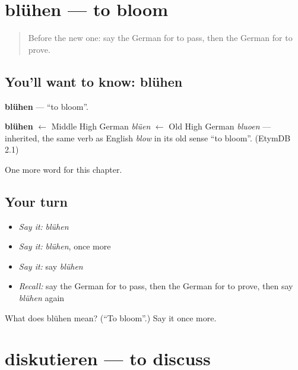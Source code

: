 \section[blühen]{blühen — to bloom}

\label{lesson:GE-C247-bluehen}



\begin{quote}
Before the new one: say the German for to pass, then the German for to prove.
\end{quote}

\subsection*{You'll want to know: blühen}
\textbf{blühen} — \textquotedblleft{}to bloom\textquotedblright{}.

\begin{cousinweb}
\textbf{blühen} $\leftarrow$ Middle High German \emph{blüen} $\leftarrow$ Old High German \emph{bluoen} — inherited, the same verb as English \emph{blow} in its old sense \textquotedblleft{}to bloom\textquotedblright{}. (EtymDB 2.1)
\end{cousinweb}

\begin{grammarlens}[title={What you've built}]
One more word for this chapter.
\end{grammarlens}

\subsection*{Your turn}
\begin{itemize}
\raggedright
  \item \emph{Say it:} \emph{blühen}
  \item \emph{Say it:} \emph{blühen}, once more
  \item \emph{Say it:} say \emph{blühen}
  \item \emph{Recall:} say the German for to pass, then the German for to prove, then say \emph{blühen} again
\end{itemize}

\begin{tcolorbox}[breakable,colback=teal!4,colframe=teal!35!black,title={Before you move on}]
What does blühen mean? (\textquotedblleft{}To bloom\textquotedblright{}.) Say it once more.
\end{tcolorbox}
\section[diskutieren]{diskutieren — to discuss}

